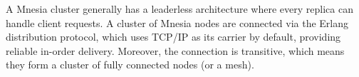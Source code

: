 A Mnesia cluster generally has a leaderless architecture where every replica can 
handle client requests. A cluster of Mnesia nodes are connected via the
Erlang distribution protocol, which uses TCP/IP as its carrier by default, providing
reliable in-order delivery. Moreover, the connection is transitive, 
which means they form a cluster of fully connected nodes (or a mesh).







